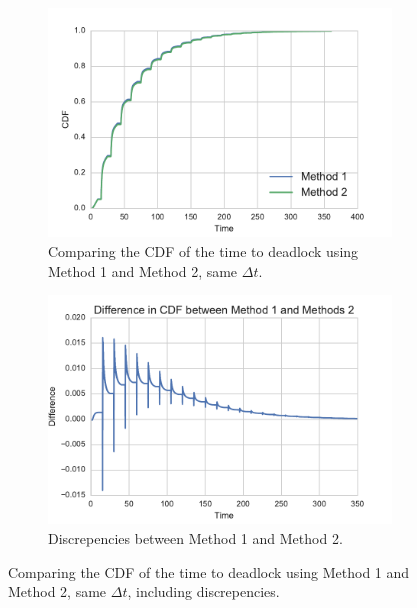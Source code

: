 \documentclass{article}
\begin{document}
\begin{figure}[!hbtp]
\begin{center}
\begin{subfigure}[b]{0.45\textwidth}
    \includegraphics[width=\textwidth]{img/method1method2_sametimestep.pdf}
    \caption{Comparing the CDF of the time to deadlock using Method 1 and Method 2, same $\Delta t$.}
    \label{fig:compare_method1method2}
\end{subfigure}
\begin{subfigure}[b]{0.45\textwidth}
    \includegraphics[width=\textwidth]{img/method1method2_sametimestep_diffs.pdf}
    \caption{Discrepencies between Method 1 and Method 2.}
    \label{fig:diffs_method1method2}
\end{subfigure}
\end{center}
\caption{Comparing the CDF of the time to deadlock using Method 1 and Method 2, same $\Delta t$, including discrepencies.}
\label{fig:method1method2}
\end{figure}
\end{document}
